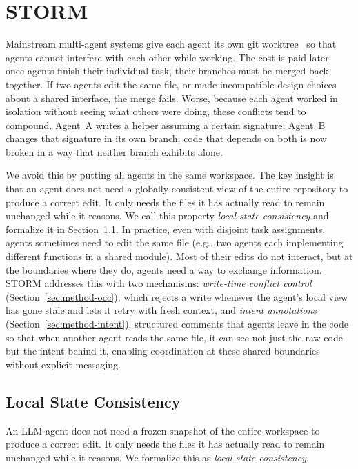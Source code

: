 \documentclass{article}
\begin{document}
\section{STORM}
\label{sec:method}

Mainstream multi-agent systems give each agent its own git worktree~\citep{caid,coral,statsclaw} so that agents cannot interfere with each other while working. The cost is paid later: once agents finish their individual task, their branches must be merged back together. If two agents edit the same file, or made incompatible design choices about a shared interface, the merge fails. Worse, because each agent worked in isolation without seeing what others were doing, these conflicts tend to compound. Agent~A writes a helper assuming a certain signature; Agent~B changes that signature in its own branch; code that depends on both is now broken in a way that neither branch exhibits alone.

We avoid this by putting all agents in the same workspace. The key insight is that an agent does not need a globally consistent view of the entire repository to produce a correct edit. It only needs the files it has actually read to remain unchanged while it reasons. We call this property \emph{local state consistency} and formalize it in Section~\ref{sec:method-formulation}. In practice, even with disjoint task assignments, agents sometimes need to edit the same file (e.g., two agents each implementing different functions in a shared module). Most of their edits do not interact, but at the boundaries where they do, agents need a way to exchange information. STORM addresses this with two mechanisms: \emph{write-time conflict control} (Section~\ref{sec:method-occ}), which rejects a write whenever the agent's local view has gone stale and lets it retry with fresh context, and \emph{intent annotations} (Section~\ref{sec:method-intent}), structured comments that agents leave in the code so that when another agent reads the same file, it can see not just the raw code but the intent behind it, enabling coordination at these shared boundaries without explicit messaging.


\subsection{Local State Consistency}
\label{sec:method-formulation}

An LLM agent does not need a frozen snapshot of the entire workspace to produce a correct edit. It only needs the files it has actually read to remain unchanged while it reasons. We formalize this as \emph{local state consistency}.
\end{document}
